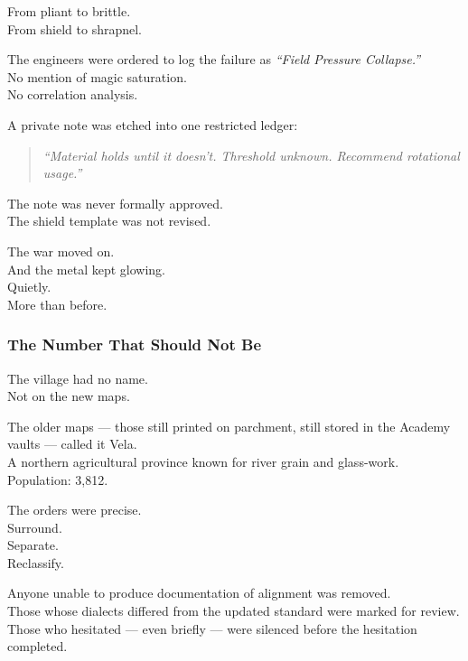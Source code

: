 \documentclass[12pt]{article}
\begin{document}
From pliant to brittle.\\
From shield to shrapnel.

\vspace{1em}

The engineers were ordered to log the failure as \textit{“Field Pressure Collapse.”}\\
No mention of magic saturation.\\
No correlation analysis.

A private note was etched into one restricted ledger:

\begin{quote}
\textit{“Material holds until it doesn’t. Threshold unknown. Recommend rotational usage.”}
\end{quote}

The note was never formally approved.\\
The shield template was not revised.

\vspace{1em}

The war moved on.\\
And the metal kept glowing.\\
Quietly.\\
More than before.

\dotfill

\subsubsection{The Number That Should Not Be}

The village had no name.\\
Not on the new maps.

The older maps — those still printed on parchment, still stored in the Academy vaults — called it Vela.\\
A northern agricultural province known for river grain and glass-work.\\
Population: 3,812.

\vspace{1em}

The orders were precise.\\
Surround.\\
Separate.\\
Reclassify.

Anyone unable to produce documentation of alignment was removed.\\
Those whose dialects differed from the updated standard were marked for review.\\
Those who hesitated — even briefly — were silenced before the hesitation completed.
\end{document}

